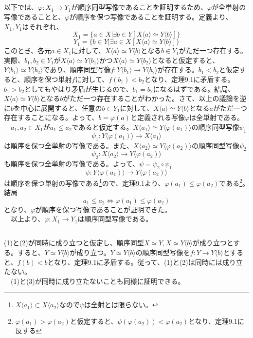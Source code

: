 \documentclass{jsarticle}
\begin{document}
\subsection{}
以下では、$\varphi:X_1\to Y_1$が順序同型写像であることを証明するため、$\varphi$が全単射の写像であることと、$\varphi$が順序を保つ写像であることを証明する。定義より、$X_1,Y_1$はそれぞれ、
\[X_1=\{a\in X|\exists b\in Y[X\langle a\rangle\simeq Y\langle b\rangle]\}\]
\[Y_1=\{b\in Y|\exists a\in X[X\langle a\rangle\simeq Y\langle b\rangle]\}\]
このとき、各元$a\in X_1$に対して、$X\langle a\rangle\simeq Y\langle b\rangle$となる$b\in Y_1$がただ一つ存在する。実際、$b_1,b_2\in Y_1$が$X\langle a\rangle\simeq Y\langle b_1\rangle$かつ$X\langle a\rangle\simeq Y\langle b_2\rangle$となると仮定すると、$Y\langle b_1\rangle\simeq Y\langle b_2\rangle$であり、順序同型写像$f:Y\langle b_1\rangle\to Y\langle b_2\rangle$が存在する。$b_1<b_2$と仮定すると、順序を保つ単射$f$に対して、$f(b_1)<b_2$となり、定理9.1に矛盾する。$b_1>b_2$としてもやはり矛盾が生じるので、$b_1=b_2$になるはずである。結局、$X\langle a\rangle\simeq Y\langle b\rangle$となる$b$がただ一つ存在することがわかった。さて、以上の議論を逆に$b$を中心に展開すると、任意の$b\in Y_1$に対して、$X\langle a\rangle\simeq Y\langle b\rangle$となる$a$がただ一つ存在することになる。よって、$b=\varphi(a)$と定義される写像$\varphi$は全単射である。\\
　$a_1,a_2\in X_1$が$a_1\leq a_2$であると仮定する。$X\langle a_1\rangle\simeq Y\langle \varphi(a_1)\rangle$の順序同型写像$\psi_1$
\[\psi_1:Y\langle \varphi(a_1)\rangle\to X\langle a_1\rangle\]
は順序を保つ全単射の写像である。また、$X\langle a_2\rangle\simeq Y\langle \varphi(a_2)\rangle$の順序同型写像$\psi_2$
\[\psi_2:X\langle a_2\rangle\to Y\langle \varphi(a_2)\rangle\]
も順序を保つ全単射の写像である。よって、$\psi=\psi_2\circ\psi_1$
\[\psi:Y\langle \varphi(a_1)\rangle\to Y\langle \varphi(a_2)\rangle\]
は順序を保つ単射の写像である\footnote{$X\langle a_1\rangle\subset X\langle a_2\rangle$なので$\psi$は全射とは限らない。}ので、定理9.1より、$\varphi(a_1)\leq\varphi(a_2)$である\footnote{$\varphi(a_1)>\varphi(a_2)$と仮定すると、$\psi(\varphi(a_2))<\varphi(a_2)$となり、定理9.1に反する}。結局\[a_1\leq a_2\Longleftrightarrow\varphi(a_1)\leq\varphi(a_2)\]となり、$\varphi$が順序を保つ写像であることが証明できた。\\
　以上より、$\varphi:X_1\to Y_1$は順序同型写像である。

\subsection{}
(1)と(2)が同時に成り立つと仮定し、順序同型$X\simeq Y, X\simeq Y\langle b\rangle$が成り立つとする。すると、$Y\simeq Y\langle b\rangle$が成り立つ。$Y\simeq Y\langle b\rangle$の順序同型写像を$f:Y\to Y\langle b\rangle$とすると、$f(b)<b$となり、定理9.1に矛盾する。従って、(1)と(2)は同時には成り立たない。\\
　(1)と(3)が同時に成り立たないことも同様に証明できる。
\end{document}
